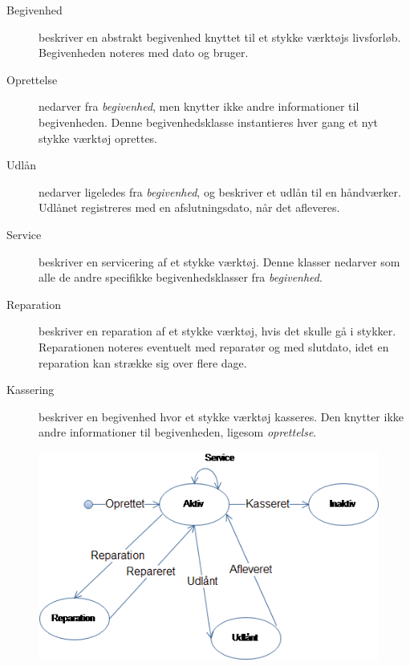 \documentclass{article}
\begin{document}
\begin{description}

\item[Begivenhed] beskriver en abstrakt begivenhed knyttet til et stykke værktøjs livsforløb. Begivenheden noteres med dato og bruger.

\item[Oprettelse] nedarver fra \emph{begivenhed}, men knytter ikke andre informationer til begivenheden. Denne begivenhedsklasse instantieres hver gang et nyt stykke værktøj oprettes.

\item[Udlån] nedarver ligeledes fra \emph{begivenhed}, og beskriver et udlån til en håndværker. Udlånet registreres med en afslutningsdato, når det afleveres.

\item[Service] beskriver en servicering af et stykke værktøj. Denne klasser nedarver som alle de andre specifikke begivenhedsklasser fra \emph{begivenhed}.

\item[Reparation] beskriver en reparation af et stykke værktøj, hvis det skulle gå i stykker. Reparationen noteres eventuelt med reparatør og med slutdato, idet en reparation kan strække sig over flere dage.

\item[Kassering] beskriver en begivenhed hvor et stykke værktøj kasseres. Den knytter ikke andre informationer til begivenheden, ligesom \emph{oprettelse}.

\end{description}

\begin{figure}[htbp]
\includegraphics[scale=0.75]{./figures/VTDiag.png}
\end{figure}
\end{document}
